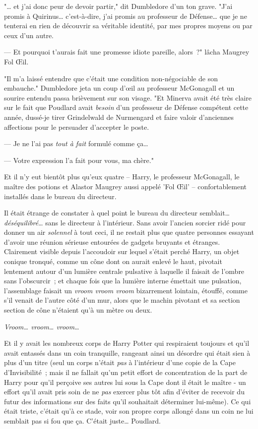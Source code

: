 
"… et j'ai donc peur de devoir partir," dit Dumbledore d'un ton grave. "J'ai promis à Quirinus… c'est-à-dire, j'ai promis au professeur de Défense… que je ne tenterai en rien de découvrir sa véritable identité, par mes propres moyens ou par ceux d'un autre.

--- Et pourquoi t'aurais fait une promesse idiote pareille, alors~?" lâcha Maugrey Fol Œil.

"Il m'a laissé entendre que c'était une condition non-négociable de son embauche." Dumbledore jeta un coup d'œil au professeur McGonagall et un sourire entendu passa brièvement sur son visage. "Et Minerva avait été très claire sur le fait que Poudlard avait \emph{besoin} d'un professeur de Défense compétent cette année, dussé-je tirer Grindelwald de Nurmengard et faire valoir d'anciennes affections pour le persuader d'accepter le poste.

--- Je ne l'ai pas \emph{tout à fait} formulé comme ça…

--- Votre expression l'a fait pour vous, ma chère."

Et il n'y eut bientôt plus qu'eux quatre -- Harry, le professeur McGonagall, le maître des potions et Alastor Maugrey aussi appelé 'Fol Œil' -- confortablement installés dans le bureau du directeur.

Il était étrange de constater à quel point le bureau du directeur semblait… \emph{déséquilibré}… sans le directeur à l'intérieur. Sans avoir l'ancien sorcier ridé pour donner un air \emph{solennel} à tout ceci, il ne restait plus que quatre personnes essayant d'avoir une réunion sérieuse entourées de gadgets bruyants et étranges. Clairement visible depuis l'accoudoir sur lequel s'était perché Harry, un objet conique tronqué, comme un cône dont on aurait enlevé le haut, pivotait lentement autour d'un lumière centrale pulsative à laquelle il faisait de l'ombre sans l'obscurcir~; et chaque fois que la lumière interne émettait une pulsation, l'assemblage faisait un \emph{vroom vroom vroom} bizarrement lointain, étouffé, comme s'il venait de l'autre côté d'un mur, alors que le machin pivotant et sa section section de cône n'étaient qu'à un mètre ou deux.

\emph{Vroom… vroom… vroom…}

Et il y avait les nombreux corps de Harry Potter qui respiraient toujours et qu'il avait entassés dans un coin tranquille, rangeant ainsi un désordre qui était sien à plus d'un titre (seul un corps n'était \emph{pas} à l'intérieur d'une copie de la Cape d'Invisibilité~; mais il ne fallait qu'un petit effort de concentration de la part de Harry pour qu'il perçoive ses autres lui sous la Cape dont il était le maître - un effort qu'il avait pris soin de ne \emph{pas} exercer plus tôt afin d'éviter de recevoir du futur des informations sur des faits qu'il souhaitait déterminer lui-même). Ce qui était triste, c'était qu'à ce stade, voir son propre corps allongé dans un coin ne lui semblait pas si fou que ça. C'était juste… Poudlard.

